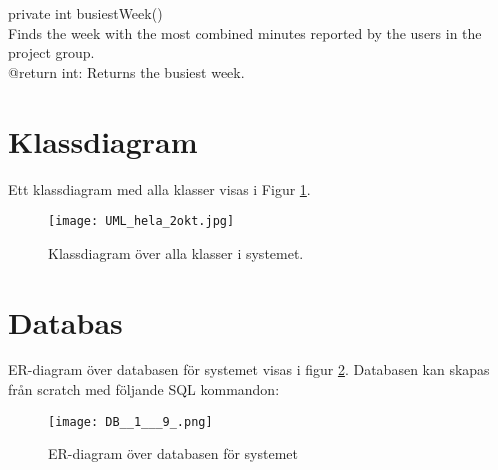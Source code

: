 \documentclass[a4paper]{article}
\begin{document}
\vspace{5mm}
\begin{hangparas}{1.5em}{1}
private int busiestWeek()\\
Finds the week with the most combined minutes reported by the users in the project group.\\
@return int: Returns the busiest week.\\
\end{hangparas}


\section{Klassdiagram}
Ett klassdiagram med alla klasser visas i Figur \ref{umldiagram}.

\begin{figure}[h!]
\centering
\texttt{[image: UML\_hela\_2okt.jpg]}
\caption{Klassdiagram över alla klasser i systemet. \label{umldiagram}}
\end{figure}



\section{Databas}

ER-diagram över databasen för systemet visas i figur \ref{ER}. Databasen kan skapas från scratch med följande SQL kommandon: \\

\begin{figure}[ht!]
\centering
\texttt{[image: DB\_\_1\_\_\_9\_.png]}
\caption{ER-diagram över databasen för systemet \label{ER}}
\end{figure}
\end{document}
